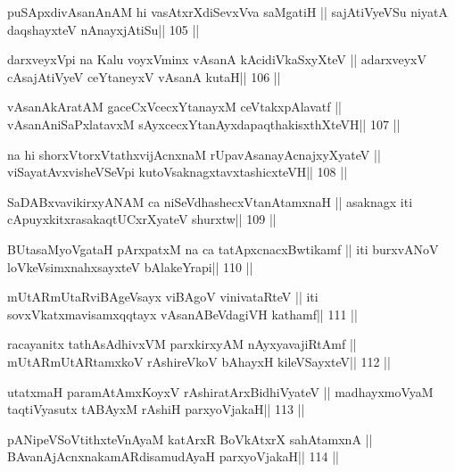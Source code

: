 \begin{shl}
puSApxdivAsanAnAM hi vasAtxrXdiSevxVva saMgatiH ||
sajAtiVyeVSu niyatA daqshayxteV nAnayxjAtiSu\hfill || 105 ||
\end{shl}

\begin{shl}
darxveyxV\s pi na Kalu voyxVminx vAsanA kAcidiVkaSxyXteV ||
adarxveyxV cAsajAtiVyeV ceYtaneyxV vAsanA kutaH\hfill || 106 ||
\end{shl}

\begin{shl}
vAsanAkAratAM gaceCxVcecxYtanayxM ceVtakxpAlavatf ||
vAsanAniSaPxlatavxM sAyxcecxYtanAyxdapaqthakisxthXteVH\hfill || 107 ||
\end{shl}

\begin{shl}
na hi shorxVtorxVtathxvijAcnxnaM rUpavAsanayA\s cnajxyXyateV ||
viSayatAvxvisheVSeV\s pi kutoV\s saknagxtavxtashicxteVH\hfill || 108 ||
\end{shl}

\begin{shl}
SaDABxvavikirxyANAM ca niSeVdhashecxVtanAtamxnaH ||
asaknagx iti cApuyxkitxrasakaqtUCxrXyateV shurxtw\hfill || 109 ||
\end{shl}

\begin{shl}
BUtasaMyoVgataH pArxpatxM na ca tatApxcnacxBwtikamf ||
iti burxvANoV loVkeV\s simxnahxsayxteV bAlakeYrapi\hfill || 110 ||
\end{shl}

\begin{shl}
mUtARmUtaRviBAgeV\s sayx viBAgoV vinivataRteV ||
iti sovxVkatxmavisamxqqtayx vAsanABeVdagiVH kathamf\hfill || 111 ||
\end{shl}

\begin{shl}
racayanitx tathA\s sAdhivxVM parxkirxyAM nAyxyavajiRtAmf ||
mUtARmUtARtamxkoV rAshireVkoV bAhayxH kileVSayxteV\hfill || 112 ||
\end{shl}

\begin{shl}
utatxmaH paramAtAmxKoyxV rAshiratArxBidhiVyateV ||
madhayxmoV\s yaM taqtiVyasutx tABAyxM rAshiH parxyoVjakaH\hfill || 113 ||
\end{shl}

\begin{shl}
pANipeVSoVtithxteVnAyaM katArxR BoVkAtxrX sahA\s\s tamxnA ||
BAvanAjAcnxnakamARdisamudAyaH parxyoVjakaH\hfill || 114 ||
\end{shl}


